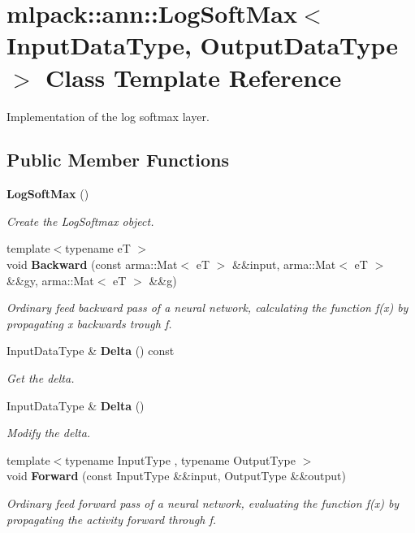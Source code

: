 \section{mlpack\+:\+:ann\+:\+:Log\+Soft\+Max$<$ Input\+Data\+Type, Output\+Data\+Type $>$ Class Template Reference}
\label{classmlpack_1_1ann_1_1LogSoftMax}


Implementation of the log softmax layer.  


\subsection*{Public Member Functions}
\begin{DoxyCompactItemize}
\item 
{\bf Log\+Soft\+Max} ()
\begin{DoxyCompactList}\small\item\em Create the Log\+Softmax object. \end{DoxyCompactList}\item 
{\footnotesize template$<$typename eT $>$ }\\void {\bf Backward} (const arma\+::\+Mat$<$ eT $>$ \&\&input, arma\+::\+Mat$<$ eT $>$ \&\&gy, arma\+::\+Mat$<$ eT $>$ \&\&g)
\begin{DoxyCompactList}\small\item\em Ordinary feed backward pass of a neural network, calculating the function f(x) by propagating x backwards trough f. \end{DoxyCompactList}\item 
Input\+Data\+Type \& {\bf Delta} () const 
\begin{DoxyCompactList}\small\item\em Get the delta. \end{DoxyCompactList}\item 
Input\+Data\+Type \& {\bf Delta} ()
\begin{DoxyCompactList}\small\item\em Modify the delta. \end{DoxyCompactList}\item 
{\footnotesize template$<$typename Input\+Type , typename Output\+Type $>$ }\\void {\bf Forward} (const Input\+Type \&\&input, Output\+Type \&\&output)
\begin{DoxyCompactList}\small\item\em Ordinary feed forward pass of a neural network, evaluating the function f(x) by propagating the activity forward through f. \end{DoxyCompactList}\item 

\end{DoxyCompactItemize}
